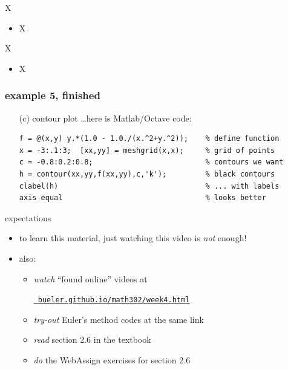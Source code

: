 \documentclass{beamer}
\begin{document}
\begin{frame}{X}

\begin{itemize}
\item X
\end{itemize}
\end{frame}


\begin{frame}{X}

\begin{itemize}
\item X
\end{itemize}
\end{frame}


\begin{frame}[fragile]
\frametitle{example 5, finished}

\begin{itemize}
\item[(c)] contour plot \dots here is Matlab/Octave code:
\begin{Verbatim}[fontsize=\footnotesize]
f = @(x,y) y.*(1.0 - 1.0./(x.^2+y.^2));    % define function
x = -3:.1:3;  [xx,yy] = meshgrid(x,x);     % grid of points
c = -0.8:0.2:0.8;                          % contours we want
h = contour(xx,yy,f(xx,yy),c,'k');         % black contours
clabel(h)                                  % ... with labels
axis equal                                 % looks better
\end{Verbatim}
\end{itemize}
\end{frame}


\begin{frame}{expectations}

\begin{itemize}
\item to learn this material, just watching this video is \emph{not} enough!

\item also:
     \begin{itemize}
     \item \emph{watch} ``found online'' videos at

     \centerline{\href{https://bueler.github.io/math302/week4.html}{\tt \color{cyan} bueler.github.io/math302/week4.html}}
     \item \emph{try-out} Euler's method codes at the same link
     \item \emph{read} section 2.6 in the textbook
     \item \emph{do} the WebAssign exercises for section 2.6
     \end{itemize}
\end{itemize}
\end{frame}
\end{document}
